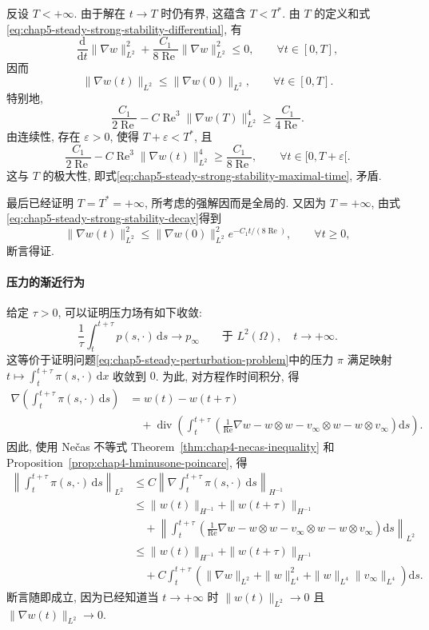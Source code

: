\begin{Proof}
反设 $T<+\infty$. 由于解在 $t\to T$ 时仍有界, 这蕴含 $T<T^*$. 由 $T$ 的定义和式\eqref{eq:chap5-steady-strong-stability-differential}, 有
\begin{equation}
 \frac{\mathrm d}{\mathrm dt}\|\nabla w\|_{L^2}^2
 +\frac{C_1}{8\operatorname{Re}}\|\nabla w\|_{L^2}^2\leq0,
 \qquad\forall t\in[0,T],
\label{eq:chap5-steady-strong-stability-decay}
\end{equation}
因而
\[
 \|\nabla w(t)\|_{L^2}\leq\|\nabla w(0)\|_{L^2},
 \qquad\forall t\in[0,T].
\]
特别地,
\[
 \frac {C_1}{2\operatorname{Re}}
 -C\operatorname{Re}^3\|\nabla w(T)\|_{L^2}^4
 \geq\frac{C_1}{4\operatorname{Re}}.
\]
由连续性, 存在 $\varepsilon>0$, 使得 $T+\varepsilon<T^*$, 且
\[
 \frac {C_1}{2\operatorname{Re}}
 -C\operatorname{Re}^3\|\nabla w(t)\|_{L^2}^4
 \geq\frac{C_1}{8\operatorname{Re}},
 \qquad\forall t\in[0,T+\varepsilon[.
\]
这与 $T$ 的极大性, 即式\eqref{eq:chap5-steady-strong-stability-maximal-time}, 矛盾.

最后已经证明 $T=T^*=+\infty$, 所考虑的强解因而是全局的. 又因为 $T=+\infty$, 由式\eqref{eq:chap5-steady-strong-stability-decay}得到
\[
 \|\nabla w(t)\|_{L^2}^2
 \leq\|\nabla w(0)\|_{L^2}^2e^{-C_1t/(8\operatorname{Re})},
 \qquad\forall t\geq0,
\]
断言得证.
\end{Proof}

\paragraph{压力的渐近行为}
\label{subsec:chap5-steady-asymptotic-pressure}

给定 $\tau>0$, 可以证明压力场有如下收敛:
\[
 \frac1\tau\int_t^{t+\tau}p(s,\cdot)\,\mathrm ds
 \longrightarrow p_\infty
 \qquad\text{于 }L^2(\Omega),\quad t\to+\infty.
\]
这等价于证明问题\eqref{eq:chap5-steady-perturbation-problem}中的压力 $\pi$ 满足映射 $t\mapsto\int_t^{t+\tau}\pi(s,\cdot)\,\mathrm dx$ 收敛到 $0$. 为此, 对方程作时间积分, 得
\begin{align*}
 \nabla\left(\int_t^{t+\tau}\pi(s,\cdot)\,\mathrm ds\right)
 &=w(t)-w(t+\tau)\\
 &\quad+\operatorname{div}\left(
 \int_t^{t+\tau}\left(
 \frac1{\operatorname{Re}}\nabla w-w\otimes w
 -v_\infty\otimes w-w\otimes v_\infty
 \right)\mathrm ds\right).
\end{align*}
因此, 使用 Nečas 不等式 Theorem~\ref{thm:chap4-necas-inequality} 和 Proposition~\ref{prop:chap4-hminusone-poincare}, 得
\begin{align*}
 \left\|\int_t^{t+\tau}\pi(s,\cdot)\,\mathrm ds\right\|_{L^2}
 &\leq C\left\|\nabla\int_t^{t+\tau}\pi(s,\cdot)\,\mathrm ds\right\|_{H^{-1}}\\
 &\leq\|w(t)\|_{H^{-1}}+\|w(t+\tau)\|_{H^{-1}}\\
 &\quad+\left\|\int_t^{t+\tau}\left(
 \frac1{\operatorname{Re}}\nabla w-w\otimes w
 -v_\infty\otimes w-w\otimes v_\infty
 \right)\mathrm ds\right\|_{L^2}\\
 &\leq\|w(t)\|_{H^{-1}}+\|w(t+\tau)\|_{H^{-1}}\\
 &\quad+C\int_t^{t+\tau}\left(
 \|\nabla w\|_{L^2}+\|w\|_{L^4}^2
 +\|w\|_{L^4}\|v_\infty\|_{L^4}\right)\mathrm ds.
\end{align*}
断言随即成立, 因为已经知道当 $t\to+\infty$ 时 $\|w(t)\|_{L^2}\to0$ 且 $\|\nabla w(t)\|_{L^2}\to0$.
